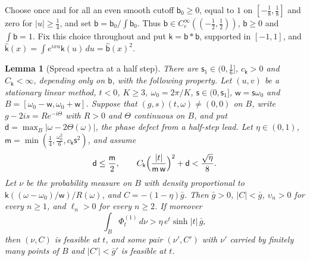 \documentclass[11pt]{article}
\newtheorem{lemma}[theorem]{Lemma}
\theoremstyle{definition}
\theoremstyle{remark}
\newcommand{\sh}{\sinh}
\begin{document}
Choose once and for all an even smooth cutoff \(\mathsf b_0\ge0\), equal to \(1\) on \([-\frac18,\frac18]\) and zero for \(|u|\ge\frac14\), and set \(\mathsf b=\mathsf b_0/\int\mathsf b_0\).  Thus \(\mathsf b\in C^\infty_c((-\frac12,\frac12))\), \(\mathsf b\ge0\) and \(\int\mathsf b=1\).  Fix this choice throughout and put
\(\mathsf k=\mathsf b*\mathsf b\), supported in \([-1,1]\), and \(\hat{\mathsf k}(x)=\int e^{ixu}\mathsf k(u)\,du=\hat{\mathsf b}(x)^2\).

\begin{lemma}[Spread spectra at a half step]\label{lem:spreadhalf}
There are \(\mathsf s_1\in(0,\frac16]\), \(c_{\mathsf k}>0\) and \(C_{\mathsf k}<\infty\), depending only on \(\mathsf b\),
with the following property.  Let \((u,v)\) be a stationary linear method, \(t<0\),
\(K\ge3\), \(\omega_0=2\pi/K\), \(\mathsf s\in(0,\mathsf s_1]\), \(\mathsf w=\mathsf s\omega_0\) and
\(B=[\omega_0-\mathsf w,\omega_0+\mathsf w]\).  Suppose that \((g,s)(t,\omega)\ne(0,0)\) on \(B\), write
\(g-2is=Re^{-i\Theta}\) with \(R>0\) and \(\Theta\) continuous on \(B\), and put
\(\mathsf d=\max_B|\omega-2\Theta(\omega)|\), the phase defect from a half-step lead.
Let \(\eta\in(0,1)\),
\(\mathsf m=\min(\frac14,\frac{\omega_0^2}6,c_{\mathsf k}\mathsf s^2)\), and assume
\begin{equation}\label{eq:spreadhyp}
\mathsf d\le\frac{\mathsf m}2,\qquad C_{\mathsf k}\Bigl(\frac{|t|}{\mathsf m\,\mathsf w}\Bigr)^2+\mathsf d<\frac{\sqrt\eta}8 .
\end{equation}
Let \(\nu\) be the probability measure on \(B\) with density proportional to
\(\mathsf k((\omega-\omega_0)/\mathsf w)/R(\omega)\), and \(C=-(1-\eta)\bar g\).  Then \(\bar g>0\), \(|C|<\bar g\),
\(\upsilon_n>0\) for every \(n\ge1\), and \(\ell_n>0\) for every \(n\ge2\).  If moreover
\begin{equation}\label{eq:spreadl1}
\int_B\Phi^{(1)}_t\,d\nu>\eta\,e^t\sh|t|\,\bar g ,
\end{equation}
then \((\nu,C)\) is feasible at \(t\), and some pair \((\nu',C')\) with \(\nu'\) carried by finitely many
points of \(B\) and \(|C'|<\bar g'\) is feasible at \(t\).
\end{lemma}
\end{document}
